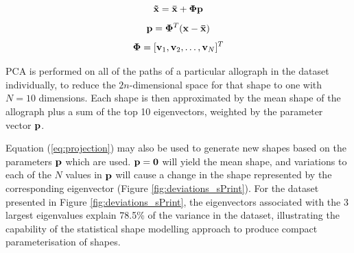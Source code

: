 \documentclass{sig-alternate}
\begin{document}
\begin{equation}\label{eq:projection}
{\bf \tilde{x}=\bar{x}+\Phi p}
\end{equation}
\begin{equation}\label{eq:paramCalc}
{\bf p} ={\bf \Phi}^T ({\bf {x}-\bar{x}})
\end{equation}
\begin{equation}\label{eq:transformCalc}
{\bf \Phi} = [{\bf v}_1, {\bf v}_2, \ldots, {\bf v}_N]^T
\end{equation}

PCA is performed on all of the paths of a particular allograph in the
dataset individually, to reduce the $2n$-dimensional space for that shape to one 
with $N=10$ dimensions.
Each shape is then approximated by the mean shape of the allograph plus a sum of the top 10
eigenvectors, weighted by the parameter vector ${\bf p}$. 
%

Equation (\ref{eq:projection}) may also be used
to generate new shapes based on the parameters ${\bf p}$ which are used. ${\bf
p}={\bf 0}$ will yield the mean shape, and variations to each of the $N$ values
in ${\bf p}$ will cause a change in the shape represented by the corresponding
eigenvector (Figure \ref{fig:deviations_sPrint}). 
For the dataset presented in Figure \ref{fig:deviations_sPrint}, the
eigenvectors associated with the 3 largest eigenvalues explain 78.5\% of the
variance in the dataset, illustrating the capability of the statistical shape
modelling approach to produce compact parameterisation of shapes. 
\end{document}

